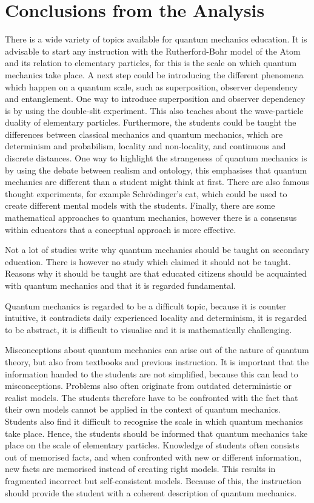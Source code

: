 \documentclass[11pt,twoside]{report} %
\begin{document}
\section{Conclusions from the Analysis}

There is a wide variety of topics available for quantum mechanics education. It is advisable to start any instruction with the Rutherford-Bohr model of the Atom and its relation to elementary particles, for this is the scale on which quantum mechanics take place. A next step could be introducing the different phenomena which happen on a quantum scale, such as superposition, observer dependency and entanglement. One way to introduce superposition and observer dependency is by using the double-slit experiment. This also teaches about the wave-particle duality of elementary particles. Furthermore, the students could be taught the differences between classical mechanics and quantum mechanics, which are determinism and probabilism, locality and non-locality, and continuous and discrete distances. One way to highlight the strangeness of quantum mechanics is by using the debate between realism and ontology, this emphasises that quantum mechanics are different than a student might think at first. There are also famous thought experiments, for example Schrödinger's cat, which could be used to create different mental models with the students. Finally, there are some mathematical approaches to quantum mechanics, however there is a consensus within educators that a conceptual approach is more effective.

Not a lot of studies write why quantum mechanics should be taught on secondary education. There is however no study which claimed it should not be taught. Reasons why it should be taught are that educated citizens should be acquainted with quantum mechanics and that it is regarded fundamental.

Quantum mechanics is regarded to be a difficult topic, because it is counter intuitive, it contradicts daily experienced locality and determinism, it is regarded to be abstract, it is difficult to visualise and it is mathematically challenging.

Misconceptions about quantum mechanics can arise out of the nature of quantum theory, but also from textbooks and previous instruction. It is important that the information handed to the students are not simplified, because this can lead to misconceptions. Problems also often originate from outdated deterministic or realist models. The students therefore have to be confronted with the fact that their own models cannot be applied in the context of quantum mechanics. Students also find it difficult to recognise the scale in which quantum mechanics take place. Hence, the students should be informed that quantum mechanics take place on the scale of elementary particles. Knowledge of students often consists out of memorised facts, and when confronted with new or different information, new facts are memorised instead of creating right models. This results in fragmented incorrect but self-consistent models. Because of this, the instruction should provide the student with a coherent description of quantum mechanics.
\end{document}
